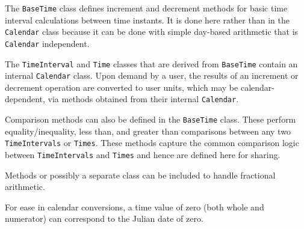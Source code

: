 The {\tt BaseTime} class defines increment and decrement methods for basic
time interval calculations between time instants.  It is done here rather
than in the {\tt Calendar} class because it can be done with simple 
day-based arithmetic that is {\tt Calendar} independent.  

The {\tt TimeInterval} and {\tt Time} classes that are derived from 
{\tt BaseTime} contain an internal {\tt Calendar} class.  Upon demand by 
a user, the results of an increment or decrement operation are 
converted to user units, which may be calendar-dependent, via methods 
obtained from their internal {\tt Calendar}.

Comparison methods can also be defined in the {\tt BaseTime} class.  These
perform equality/inequality, less than, and greater than comparisons
between any two {\tt TimeIntervals} or {\tt Times}.  These methods capture
the common comparison logic between {\tt TimeIntervals} and {\tt Times} and
hence are defined here for sharing.

Methods or possibly a separate class can be included to handle fractional
arithmetic. 

For ease in calendar conversions, a time value of zero (both whole and
numerator) can correspond to the Julian date of zero. 













